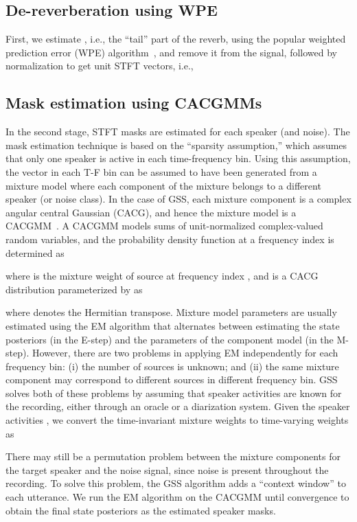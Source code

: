 \documentclass[a4paper]{article}
\begin{document}
\subsection{De-reverberation using WPE}
\label{sec:wpe}

First, we estimate , i.e., the ``tail'' part of the reverb, using the popular weighted prediction error (WPE) algorithm~\cite{Nakatani2008BlindSD,Nakatani2010SpeechDB}, and remove it from the signal, followed by normalization to get unit STFT vectors, i.e.,


\subsection{Mask estimation using CACGMMs}
\label{sec:mask}

In the second stage, STFT masks are estimated for each speaker (and noise). The mask estimation technique is based on the ``sparsity assumption,'' which assumes that only one speaker is active in each time-frequency bin. Using this assumption, the vector in each T-F bin can be assumed to have been generated from a mixture model where each component of the mixture belongs to a different speaker (or noise class). In the case of GSS, each mixture component is a complex angular central Gaussian (CACG), and hence the mixture model is a CACGMM~\cite{Ito2016ComplexAC}. A CACGMM models sums of unit-normalized complex-valued random variables, and the probability density function at a frequency index  is determined as

where  is the mixture weight of source  at frequency index , and  is a CACG distribution parameterized by  as

where  denotes the Hermitian transpose. Mixture model parameters are usually estimated using the EM algorithm that alternates between estimating the state posteriors (in the E-step) and the parameters of the component model (in the M-step). However, there are two problems in applying EM independently for each frequency bin: (i) the number of sources  is unknown; and (ii) the same mixture component may correspond to different sources in different frequency bin. GSS solves both of these problems by assuming that speaker activities are known for the recording, either through an oracle or a diarization system. Given the speaker activities , we convert the time-invariant mixture weights to time-varying weights as

There may still be a permutation problem between the mixture components for the target speaker and the noise signal, since noise is present throughout the recording. To solve this problem, the GSS algorithm adds a ``context window'' to each utterance. We run the EM algorithm on the CACGMM until convergence to obtain the final state posteriors  as the estimated speaker masks.
\end{document}
